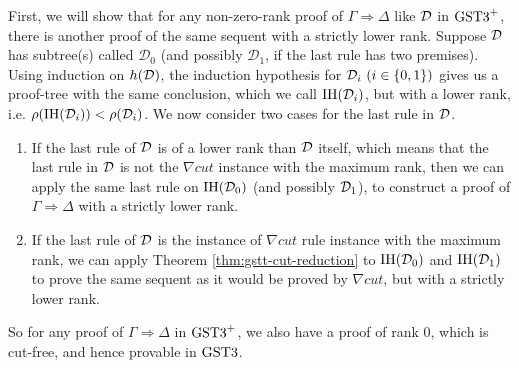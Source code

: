 
First, we will show that for any non-zero-rank proof of $\Gamma \Rightarrow \Delta$ like $\mathcal{D}$ in $\text{GST3}^+$, there is another proof of the same sequent with a strictly lower rank. Suppose $\mathcal{D}$ has subtree(s) called $\mathcal{D}_0$ (and possibly $\mathcal{D}_1$, if the last rule has two premises). Using induction on $h(\mathcal{D})$, the induction hypothesis for $\mathcal{D}_i ~(i \in \{0,1\})$ gives us a proof-tree with the same conclusion, which we call $\mathrm{IH}(\mathcal{D}_i)$, but with a lower rank, i.e. $\rho(\mathrm{IH}(\mathcal{D}_i)) < \rho(\mathcal{D}_i)$. We now consider two cases for the last rule in $\mathcal{D}$.

\begin{enumerate}[label=\Roman*]
	\item If the last rule of $\mathcal{D}$ is of a lower rank than $\mathcal{D}$ itself, which means that the last rule in $\mathcal{D}$ is not the $\nabla cut$ instance with the maximum rank, then we can apply the same last rule on $\mathrm{IH}(\mathcal{D}_0)$ (and possibly $\mathcal{D}_1$), to construct a proof of $\Gamma \Rightarrow \Delta$ with a strictly lower rank.
	
	\item If the last rule of $\mathcal{D}$ is the instance of $\nabla cut$ rule instance with the maximum rank, we can apply Theorem \ref{thm:gstt-cut-reduction} to $\mathrm{IH}(\mathcal{D}_0)$ and $\mathrm{IH}(\mathcal{D}_1)$ to prove the same sequent as it would be proved by $\nabla cut$, but with a strictly lower rank.
\end{enumerate}
So for any proof of $\Gamma \Rightarrow \Delta$ in $\text{GST3}^+$, we also have a proof of rank $0$, which is cut-free, and hence provable in $\text{GST3}$.
